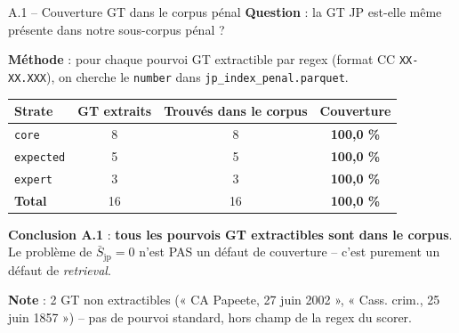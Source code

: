 \documentclass[aspectratio=169,10pt]{beamer}
\newcommand{\okbox}[1]{%
  \begin{center}
  \colorbox{green!10}{\parbox{0.92\linewidth}{\centering #1}}
  \end{center}}
\begin{document}
\begin{frame}{A.1 -- Couverture GT dans le corpus pénal}
  \footnotesize
  \textbf{Question} : la GT JP est-elle même présente dans notre sous-corpus pénal ?

  \vspace{0.4em}
  \textbf{Méthode} : pour chaque pourvoi GT extractible par regex (format CC \texttt{XX-XX.XXX}), on cherche le \texttt{number} dans \texttt{jp\_index\_penal.parquet}.

  \vspace{0.4em}
  \begin{tabular}{@{}l c c c@{}}
    \toprule
    \textbf{Strate} & \textbf{GT extraits} & \textbf{Trouvés dans le corpus} & \textbf{Couverture} \\
    \midrule
    \texttt{core}     & 8 & 8 & \textbf{100,0 \%} \\
    \texttt{expected} & 5 & 5 & \textbf{100,0 \%} \\
    \texttt{expert}   & 3 & 3 & \textbf{100,0 \%} \\
    \midrule
    \textbf{Total}    & 16 & 16 & \textbf{100,0 \%} \\
    \bottomrule
  \end{tabular}

  \vspace{0.5em}
  \okbox{\textbf{Conclusion A.1} : \textbf{tous les pourvois GT extractibles sont dans le corpus}.\\
  Le problème de \(\bar{S}_{\text{jp}} = 0\) n'est PAS un défaut de couverture -- c'est purement un défaut de \textit{retrieval}.}

  \vspace{0.4em}
  \textbf{Note} : 2 GT non extractibles (« CA Papeete, 27 juin 2002 », « Cass. crim., 25 juin 1857 ») -- pas de pourvoi standard, hors champ de la regex du scorer.
\end{frame}
\end{document}
